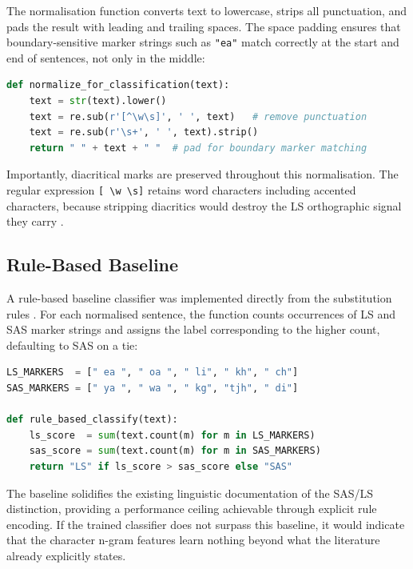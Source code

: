 \documentclass[12pt]{ThesisRU}
\begin{document}
The normalisation function converts text to lowercase, strips all punctuation, and pads the result with leading and trailing spaces. The space padding ensures that boundary-sensitive marker strings such as \texttt{"ea"} match correctly at the start and end of sentences, not only in the middle:

\begin{lstlisting}[language=Python, caption={Pre-classification normalisation.}, label={lst:norm}]
def normalize_for_classification(text):
    text = str(text).lower()
    text = re.sub(r'[^\w\s]', ' ', text)   # remove punctuation
    text = re.sub(r'\s+', ' ', text).strip()
    return " " + text + " "  # pad for boundary marker matching
\end{lstlisting}

Importantly, diacritical marks are preserved throughout this normalisation. The regular expression \texttt{[~\textbackslash w \textbackslash s]} retains word characters including accented characters, because stripping diacritics would destroy the LS orthographic signal they carry \citep{matlosa2017sesotho}.

\subsection{Rule-Based Baseline}

A rule-based baseline classifier was implemented directly from the substitution rules \citet{makutoane2022people}. For each normalised sentence, the function counts occurrences of LS and SAS marker strings and assigns the label corresponding to the higher count, defaulting to SAS on a tie:

\begin{lstlisting}[language=Python, caption={Rule-based baseline classifier.}, label={lst:rulebased}]
LS_MARKERS  = [" ea ", " oa ", " li", " kh", " ch"]
SAS_MARKERS = [" ya ", " wa ", " kg", "tjh", " di"]
 
def rule_based_classify(text):
    ls_score  = sum(text.count(m) for m in LS_MARKERS)
    sas_score = sum(text.count(m) for m in SAS_MARKERS)
    return "LS" if ls_score > sas_score else "SAS"
\end{lstlisting}

The baseline solidifies the existing linguistic documentation of the SAS/LS distinction, providing a performance ceiling achievable through explicit rule encoding. If the trained classifier does not surpass this baseline, it would indicate that the character n-gram features learn nothing beyond what the literature already explicitly states.
\end{document}
